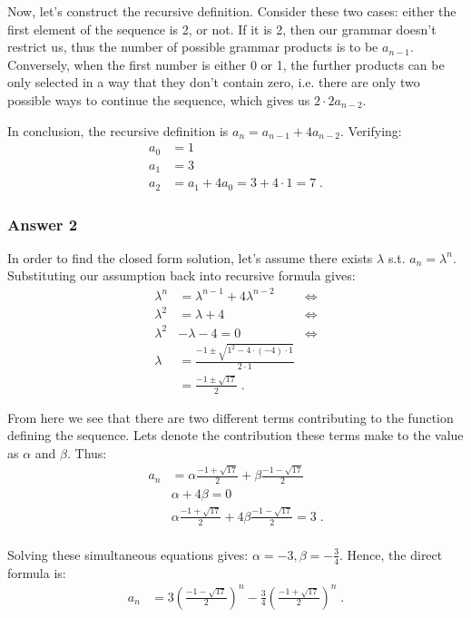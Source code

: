 \documentclass[11pt]{article}
\begin{document}
Now, let's construct the recursive definition.  Consider these two cases:
either the first element of the sequence is 2, or not.  If it is 2, then our
grammar doesn't restrict us, thus the number of possible grammar products is
to be \(a_{n-1}\).  Conversely, when the first number is either 0 or 1, the
further products can be only selected in a way that they don't contain zero,
i.e. there are only two possible ways to continue the sequence, which gives
us \(2 \cdot 2 a_{n-2}\).

In conclusion, the recursive definition is \(a_n = a_{n-1} + 4a_{n-2}\).
Verifying:
\begin{align*}
  a_0 &= 1 \\
  a_1 &= 3 \\
  a_2 &= a_1 + 4a_0 = 3 + 4 \cdot 1 = 7\;.
\end{align*}

\subsubsection{Answer 2}
\label{sec:orgheadline2}
In order to find the closed form solution, let's assume there exists
\(\lambda\) s.t. \(a_n = \lambda^n\).  Substituting our assumption back into
recursive formula gives:
\begin{align*}
  \lambda^n &= \lambda^{n-1} + 4\lambda^{n-2} &\iff \\
  \lambda^2 &= \lambda + 4                   &\iff \\
  \lambda^2 &- \lambda - 4 = 0               &\iff \\
  \lambda   &= \frac{-1 \pm \sqrt{1^2 - 4 \cdot (-4) \cdot 1}}{2 \cdot 1} \\
            &= \frac{-1 \pm \sqrt{17}}{2}\;.
\end{align*}

From here we see that there are two different terms contributing to the
function defining the sequence.  Lets denote the contribution these terms
make to the value as \(\alpha\) and \(\beta\).  Thus:
\begin{align*}
  a_n &= \alpha \frac{-1 + \sqrt{17}}{2} + \beta \frac{-1 - \sqrt{17}}{2} \\
      &\alpha + 4 \beta = 0 \\
      &\alpha \frac{-1 + \sqrt{17}}{2} + 4 \beta \frac{-1 - \sqrt{17}}{2} = 3\;. \\
\end{align*}

Solving these simultaneous equations gives: \(\alpha = -3, \beta = -\frac{3}{4}\).
Hence, the direct formula is:
\begin{align*}
  a_n &= 3 \left(\frac{-1 - \sqrt{17}}{2}\right)^n - 
  \frac{3}{4}\left(\frac{-1 + \sqrt{17}}{2}\right)^n\;.
\end{align*}
\end{document}
